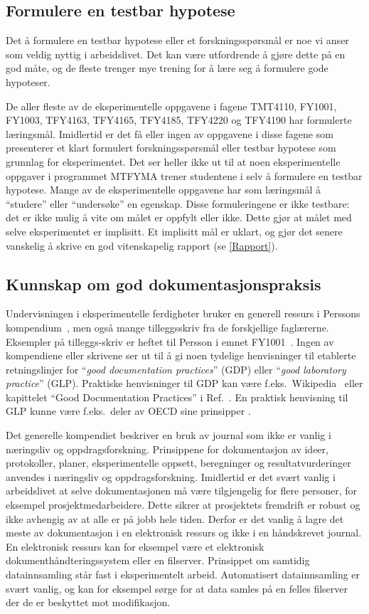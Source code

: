 \documentclass{article}
\begin{document}
\subsection{Formulere en testbar hypotese}
Det å formulere en testbar hypotese eller et forskningsspørsmål er noe vi anser som veldig nyttig i arbeidslivet. Det kan være utfordrende å gjøre dette på en god måte, og de fleste trenger mye trening for å lære seg å formulere gode hypoteser.

De aller fleste av de eksperimentelle oppgavene i fagene TMT4110, FY1001, FY1003, TFY4163, TFY4165, TFY4185, TFY4220 og TFY4190 har formulerte læringsmål. Imidlertid er det få eller ingen av oppgavene i disse fagene som presenterer et klart formulert forskningsspørsmål eller testbar hypotese som grunnlag for eksperimentet. Det ser heller ikke ut til at noen eksperimentelle oppgaver i programmet MTFYMA trener studentene i selv å formulere en testbar hypotese. Mange av de eksperimentelle oppgavene har som læringsmål å ``studere'' eller ``undersøke'' en egenskap. Disse formuleringene er ikke testbare: det er ikke mulig å vite om målet er oppfylt eller ikke. Dette gjør at målet med selve eksperimentet er implisitt. Et implisitt mål er uklart, og gjør det senere vanskelig å skrive en god vitenskapelig rapport (se \cref{Rapport}).

\subsection{Kunnskap om god dokumentasjonspraksis}
Undervisningen i eksperimentelle ferdigheter bruker en generell ressurs i Perssons kompendium~\cite{Persson2020}, men også mange tilleggsskriv fra de forskjellige faglærerne. Eksempler på tilleggs-skriv er heftet til Persson i emnet FY1001~\cite{Persson2020FY1001}. Ingen av kompendiene eller skrivene ser ut til å gi noen tydelige henvisninger til etablerte retningslinjer for ``\emph{good documentation practices}'' (GDP) eller ``\emph{good laboratory practice}'' (GLP). Praktiske henvisninger til GDP kan være f.eks.~Wikipedia~\cite{WikiGDP} eller kapittelet ``Good Documentation Practices'' i Ref.~\cite{Davani2017}. En praktisk henvisning til GLP kunne være f.eks.~deler av OECD sine prinsipper \cite{OECD1997}.

Det generelle kompendiet \cite{Persson2020} beskriver en bruk av journal som ikke er vanlig i næringsliv og oppdragsforskning. Prinsippene for dokumentasjon av ideer, protokoller, planer, eksperimentelle oppsett, beregninger og resultatvurderinger anvendes i næringsliv og oppdragsforskning. Imidlertid er det svært vanlig i arbeidslivet at selve dokumentasjonen må være tilgjengelig for flere personer, for eksempel prosjektmedarbeidere. Dette sikrer at prosjektets fremdrift er robust og ikke avhengig av at alle er på jobb hele tiden. Derfor er det vanlig å lagre det meste av dokumentasjon i en elektronisk ressurs og ikke i en håndskrevet journal. En elektronisk ressurs kan for eksempel være et elektronisk dokumenthåndteringssystem eller en filserver. Prinsippet om samtidig datainnsamling står fast i eksperimentelt arbeid. Automatisert datainnsamling er svært vanlig, og kan for eksempel sørge for at data samles på en felles filserver der de er beskyttet mot modifikasjon.
\end{document}
